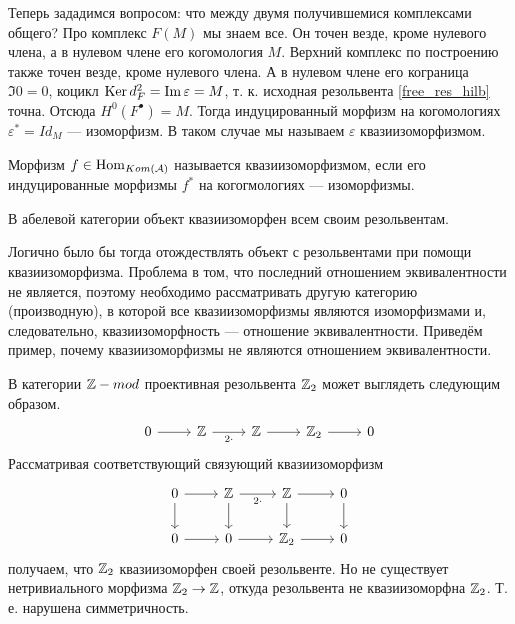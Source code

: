 \documentclass[../hw_main.tex]{subfiles}
\begin{document}
Теперь зададимся вопросом: что между двумя получившемися комплексами общего? Про комплекс $F(M)$ мы знаем все. Он точен везде, кроме нулевого члена, а в нулевом члене его когомология $M$. Верхний комплекс по построению также точен везде, кроме нулевого члена. А в нулевом члене его кограница $\Im 0 = 0$, коцикл $\mathop{\mathrm{Ker}}\nolimits d^2_F = \mathop{\mathrm{Im}}\nolimits \varepsilon = M$, т. к. исходная резольвента \eqref{free_res_hilb} точна. Отсюда $H^0(F^\bullet) = M$. Тогда индуцированный морфизм на когомологиях $\varepsilon^* = Id_M$ --- изоморфизм. В таком случае мы называем $\varepsilon$ квазиизоморфизмом.
\begin{to_def}
Морфизм $f\in \operatorname{Hom}_{Kom(\mathcal{A})}$ называется квазиизоморфизмом, если его индуцированные морфизмы $f^*$ на когогмологиях --- изоморфизмы.
\end{to_def}
\begin{to_suj}\label{obj_res_eq}
В абелевой категории объект квазиизоморфен всем своим резольвентам.
\end{to_suj}
Логично было бы тогда отождествлять объект с резольвентами при помощи квазиизоморфизма. Проблема в том, что последний отношением эквивалентности не является, поэтому необходимо рассматривать другую категорию (производную), в которой все квазиизоморфизмы являются изоморфизмами и, следовательно, квазиизоморфность --- отношение эквивалентности.
Приведём пример, почему квазиизоморфизмы не являются отношением эквивалентности.
\begin{to_ex}
В категории $\mathbb{Z}-mod$ проективная резольвента $\mathbb{Z}_2$ может выглядеть следующим образом.
\begin{equation*}
    \begin{tikzcd}
	0 & \Z & \Z & {\Z_2} & 0
	\arrow[from=1-1, to=1-2]
	\arrow["2\cdot"', from=1-2, to=1-3]
	\arrow[from=1-3, to=1-4]
	\arrow[from=1-4, to=1-5]
\end{tikzcd}
\end{equation*}
Рассматривая соответствующий связующий квазиизоморфизм
\begin{equation*}
    \begin{tikzcd}
	0 & \Z & \Z & 0 \\
	0 & 0 & {\Z_2} & 0
	\arrow[from=1-1, to=1-2]
	\arrow["2\cdot"', from=1-2, to=1-3]
	\arrow[from=1-3, to=1-4]
	\arrow[from=1-3, to=2-3]
	\arrow[from=1-4, to=2-4]
	\arrow[from=1-2, to=2-2]
	\arrow[from=1-1, to=2-1]
	\arrow[from=2-1, to=2-2]
	\arrow[from=2-2, to=2-3]
	\arrow[from=2-3, to=2-4]
\end{tikzcd}
\end{equation*}
получаем, что $\mathbb{Z}_2$ квазиизоморфен своей резольвенте. Но не существует нетривиального морфизма $\mathbb{Z}_2\to \mathbb{Z}$, откуда резольвента не квазиизоморфна $\mathbb{Z}_2$. Т. е. нарушена симметричность.
\end{to_ex}
\end{document}

